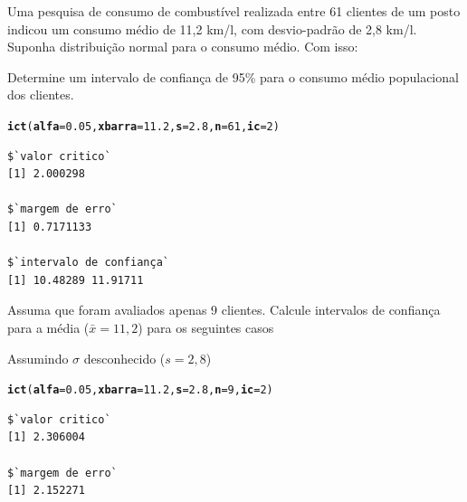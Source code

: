 \documentclass[a4paper,11pt,fleqn]{article}\usepackage[]{graphicx}\usepackage[]{color}
\makeatletter
\newcommand{\hlnum}[1]{\textcolor[rgb]{0,0,0}{#1}}%
\newcommand{\hlstd}[1]{\textcolor[rgb]{0,0,0}{#1}}%
\newcommand{\hlkwc}[1]{\textcolor[rgb]{0,0,0}{\textbf{#1}}}%
\newcommand{\hlkwd}[1]{\textcolor[rgb]{0,0,0}{\textbf{#1}}}%
\newenvironment{kframe}{%
 \def\at@end@of@kframe{}%
 \ifinner\ifhmode%
  \def\at@end@of@kframe{\end{minipage}}%
  \begin{minipage}{\columnwidth}%
 \fi\fi%
 \def\FrameCommand##1{\hskip\@totalleftmargin \hskip-\fboxsep
 \colorbox{shadecolor}{##1}\hskip-\fboxsep
     \hskip-\linewidth \hskip-\@totalleftmargin \hskip\columnwidth}%
 \MakeFramed {\advance\hsize-\width
   \@totalleftmargin\z@ \linewidth\hsize
   \@setminipage}}%
 {\par\unskip\endMakeFramed%
 \at@end@of@kframe}
\newenvironment{knitrout}{}{} %
\theoremstyle{definition}
\makeatother
\begin{document}
\begin{compactenum}[11.] %
\item Uma pesquisa de consumo de combustível realizada entre 61
  clientes de um posto indicou um consumo médio de 11,2 km/l, com
  desvio-padrão de 2,8 km/l. Suponha distribuição normal para o
    consumo médio. Com isso:
  \begin{compactenum}
  \item Determine um intervalo de confiança de 95\% para o consumo médio
    populacional dos clientes.
\begin{knitrout}\small
{}\color{fgcolor}\begin{kframe}
\begin{alltt}
\hlkwd{ict}\hlstd{(}\hlkwc{alfa} \hlstd{=} \hlnum{0.05}\hlstd{,} \hlkwc{xbarra} \hlstd{=} \hlnum{11.2}\hlstd{,} \hlkwc{s} \hlstd{=} \hlnum{2.8}\hlstd{,} \hlkwc{n} \hlstd{=} \hlnum{61}\hlstd{,} \hlkwc{ic} \hlstd{=} \hlnum{2}\hlstd{)}
\end{alltt}
\begin{verbatim}
$`valor critico`
[1] 2.000298

$`margem de erro`
[1] 0.7171133

$`intervalo de confiança`
[1] 10.48289 11.91711
\end{verbatim}
\end{kframe}
\end{knitrout}
  \item Assuma que foram avaliados apenas 9 clientes. Calcule intervalos
    de confiança para a média ($\bar{x} = 11,2$) para os seguintes casos
    \begin{compactenum}
    \item Assumindo $\sigma$ desconhecido ($s=2,8$)
\begin{knitrout}\small
{}\color{fgcolor}\begin{kframe}
\begin{alltt}
\hlkwd{ict}\hlstd{(}\hlkwc{alfa} \hlstd{=} \hlnum{0.05}\hlstd{,} \hlkwc{xbarra} \hlstd{=} \hlnum{11.2}\hlstd{,} \hlkwc{s} \hlstd{=} \hlnum{2.8}\hlstd{,} \hlkwc{n} \hlstd{=} \hlnum{9}\hlstd{,} \hlkwc{ic} \hlstd{=} \hlnum{2}\hlstd{)}
\end{alltt}
\begin{verbatim}
$`valor critico`
[1] 2.306004

$`margem de erro`
[1] 2.152271


\end{verbatim}
\end{kframe}
\end{knitrout}
\end{compactenum}
\end{compactenum}
\end{compactenum}
\end{document}
